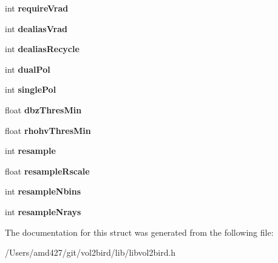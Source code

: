 \begin{DoxyCompactItemize}
int {\bfseries require\+Vrad}
\item 
\mbox{\label{structvol2birdOptions_aa3e5a827a2ba9b8f4b818b6fe03904f7}} 
int {\bfseries dealias\+Vrad}
\item 
\mbox{\label{structvol2birdOptions_ae399945bb610c4b7da35d38a7397d13c}} 
int {\bfseries dealias\+Recycle}
\item 
\mbox{\label{structvol2birdOptions_aeeeba5daec7f3089c7508fbfbe76333d}} 
int {\bfseries dual\+Pol}
\item 
\mbox{\label{structvol2birdOptions_a1f438ad8503f400203c553a824e1539f}} 
int {\bfseries single\+Pol}
\item 
\mbox{\label{structvol2birdOptions_a83ffeba065fb1ef6e96bd22acf799d35}} 
float {\bfseries dbz\+Thres\+Min}
\item 
\mbox{\label{structvol2birdOptions_a9c461fc4b7b99163125775b9381ee5d6}} 
float {\bfseries rhohv\+Thres\+Min}
\item 
\mbox{\label{structvol2birdOptions_ac1f47fbac4ef6bc48f5004156de88ca1}} 
int {\bfseries resample}
\item 
\mbox{\label{structvol2birdOptions_aab2d65f1b66364c012a327e0a9c12182}} 
float {\bfseries resample\+Rscale}
\item 
\mbox{\label{structvol2birdOptions_a4bad5097bf91a91022ea92f2ecdfb3e0}} 
int {\bfseries resample\+Nbins}
\item 
\mbox{\label{structvol2birdOptions_ac34c5001a167b1b1005d86c2a884e118}} 
int {\bfseries resample\+Nrays}
\end{DoxyCompactItemize}


The documentation for this struct was generated from the following file\+:\begin{DoxyCompactItemize}
\item 
/\+Users/amd427/git/vol2bird/lib/libvol2bird.\+h\end{DoxyCompactItemize}
